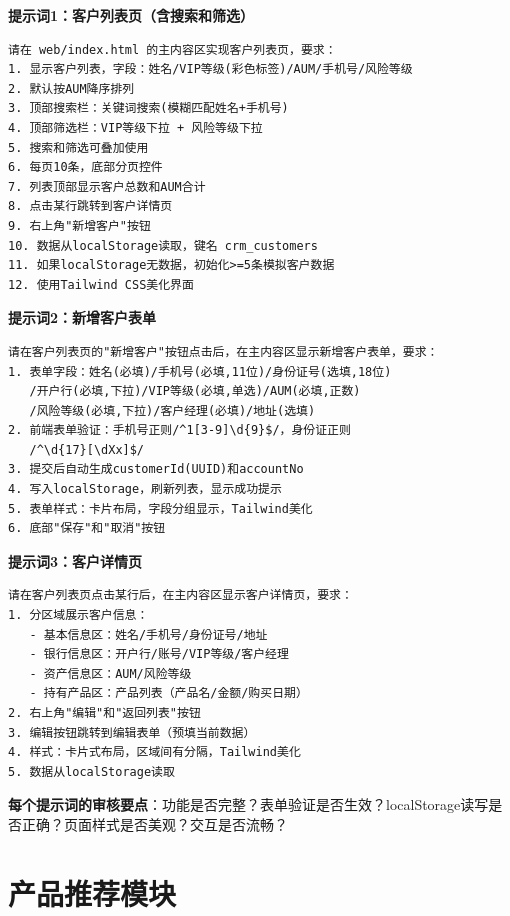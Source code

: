 \begin{practicebox}[分步骤用AI实现客户管理]
\textbf{提示词1：客户列表页（含搜索和筛选）}

\begin{lstlisting}
请在 web/index.html 的主内容区实现客户列表页，要求：
1. 显示客户列表，字段：姓名/VIP等级(彩色标签)/AUM/手机号/风险等级
2. 默认按AUM降序排列
3. 顶部搜索栏：关键词搜索(模糊匹配姓名+手机号)
4. 顶部筛选栏：VIP等级下拉 + 风险等级下拉
5. 搜索和筛选可叠加使用
6. 每页10条，底部分页控件
7. 列表顶部显示客户总数和AUM合计
8. 点击某行跳转到客户详情页
9. 右上角"新增客户"按钮
10. 数据从localStorage读取，键名 crm_customers
11. 如果localStorage无数据，初始化>=5条模拟客户数据
12. 使用Tailwind CSS美化界面
\end{lstlisting}

\textbf{提示词2：新增客户表单}

\begin{lstlisting}
请在客户列表页的"新增客户"按钮点击后，在主内容区显示新增客户表单，要求：
1. 表单字段：姓名(必填)/手机号(必填,11位)/身份证号(选填,18位)
   /开户行(必填,下拉)/VIP等级(必填,单选)/AUM(必填,正数)
   /风险等级(必填,下拉)/客户经理(必填)/地址(选填)
2. 前端表单验证：手机号正则/^1[3-9]\d{9}$/，身份证正则
   /^\d{17}[\dXx]$/
3. 提交后自动生成customerId(UUID)和accountNo
4. 写入localStorage，刷新列表，显示成功提示
5. 表单样式：卡片布局，字段分组显示，Tailwind美化
6. 底部"保存"和"取消"按钮
\end{lstlisting}

\textbf{提示词3：客户详情页}

\begin{lstlisting}
请在客户列表页点击某行后，在主内容区显示客户详情页，要求：
1. 分区域展示客户信息：
   - 基本信息区：姓名/手机号/身份证号/地址
   - 银行信息区：开户行/账号/VIP等级/客户经理
   - 资产信息区：AUM/风险等级
   - 持有产品区：产品列表（产品名/金额/购买日期）
2. 右上角"编辑"和"返回列表"按钮
3. 编辑按钮跳转到编辑表单（预填当前数据）
4. 样式：卡片式布局，区域间有分隔，Tailwind美化
5. 数据从localStorage读取
\end{lstlisting}

\textbf{每个提示词的审核要点}：功能是否完整？表单验证是否生效？localStorage读写是否正确？页面样式是否美观？交互是否流畅？
\end{practicebox}

\section{产品推荐模块}

